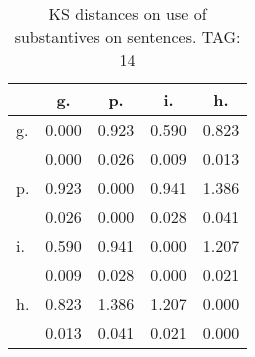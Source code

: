 \begin{table}[h!]
\begin{center}
\begin{tabular}{| l | c | c | c | c |}\hline
 & g. & p. & i. & h. \\\hline
g. & 0.000  & 0.923  & 0.590  & 0.823 \\\hline
 & 0.000  & 0.026  & 0.009  & 0.013 \\\hline
p. & 0.923  & 0.000  & 0.941  & 1.386 \\\hline
 & 0.026  & 0.000  & 0.028  & 0.041 \\\hline
i. & 0.590  & 0.941  & 0.000  & 1.207 \\\hline
 & 0.009  & 0.028  & 0.000  & 0.021 \\\hline
h. & 0.823  & 1.386  & 1.207  & 0.000 \\\hline
 & 0.013  & 0.041  & 0.021  & 0.000 \\\hline
\end{tabular}
\caption{KS distances on use of substantives on sentences. TAG: 14}
\end{center}
\end{table}